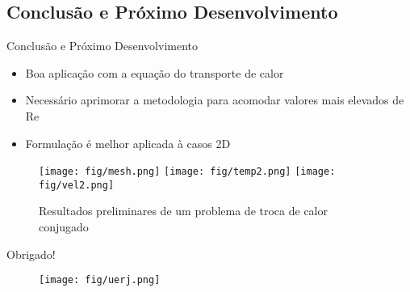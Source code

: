 \documentclass{beamer}
\begin{document}
    \subsection{Conclusão e Próximo Desenvolvimento}
    \begin{frame}{Conclusão e Próximo Desenvolvimento}
    \begin{itemize}
    \item Boa aplicação com a equação do transporte de calor
    \item Necessário aprimorar a metodologia para acomodar valores mais elevados de Re 
    \item Formulação é melhor aplicada à casos 2D
    \end{itemize}
%		

	    \begin{figure}
	    \centering
	    	\texttt{[image: fig/mesh.png]} \hspace{0.2cm}
	    	\texttt{[image: fig/temp2.png]} \hspace{0.2cm}
	    	\texttt{[image: fig/vel2.png]}
	    	\caption{\footnotesize{Resultados preliminares de um problema de troca de calor conjugado}}
	    \end{figure}
	 \end{frame}
            

    \begin{frame}%
\centering  \huge{Obrigado!}
        \begin{figure}
        	\texttt{[image: fig/uerj.png]}
        \end{figure}
    \end{frame}
\end{document}
